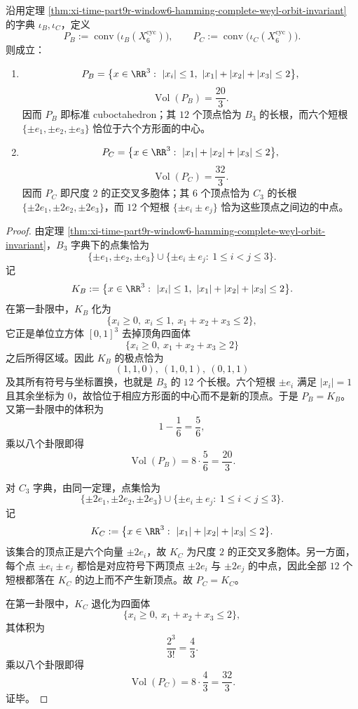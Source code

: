 \begin{theorem}\label{thm:xi-time-part9r-window6-b3c3-root-polytopes}
沿用定理 \ref{thm:xi-time-part9r-window6-hamming-complete-weyl-orbit-invariant} 的字典 \(\iota_B,\iota_C\)，定义
\[
P_B:=\operatorname{conv}\bigl(\iota_B(X_6^{\mathrm{cyc}})\bigr),
\qquad
P_C:=\operatorname{conv}\bigl(\iota_C(X_6^{\mathrm{cyc}})\bigr).
\]
则成立：
\begin{enumerate}
  \item
  \[
  P_B
  =
  \bigl\{x\in\RR^3:\ |x_i|\le 1,\ |x_1|+|x_2|+|x_3|\le 2\bigr\},
  \]
  \[
  \operatorname{Vol}(P_B)=\frac{20}{3}.
  \]
  因而 \(P_B\) 即标准 cuboctahedron；其 \(12\) 个顶点恰为 \(B_3\) 的长根，而六个短根 \(\{\pm e_1,\pm e_2,\pm e_3\}\) 恰位于六个方形面的中心。
  \item
  \[
  P_C
  =
  \bigl\{x\in\RR^3:\ |x_1|+|x_2|+|x_3|\le 2\bigr\},
  \]
  \[
  \operatorname{Vol}(P_C)=\frac{32}{3}.
  \]
  因而 \(P_C\) 即尺度 \(2\) 的正交叉多胞体；其 \(6\) 个顶点恰为 \(C_3\) 的长根 \(\{\pm 2e_1,\pm 2e_2,\pm 2e_3\}\)，而 \(12\) 个短根 \(\{\pm e_i\pm e_j\}\) 恰为这些顶点之间边的中点。
\end{enumerate}
\end{theorem}
\begin{proof}
由定理 \ref{thm:xi-time-part9r-window6-hamming-complete-weyl-orbit-invariant}，\(B_3\) 字典下的点集恰为
\[
\{\pm e_1,\pm e_2,\pm e_3\}\cup\{\pm e_i\pm e_j:\ 1\le i<j\le 3\}.
\]
记
\[
K_B:=\bigl\{x\in\RR^3:\ |x_i|\le 1,\ |x_1|+|x_2|+|x_3|\le 2\bigr\}.
\]
在第一卦限中，\(K_B\) 化为
\[
\bigl\{x_i\ge 0,\ x_i\le 1,\ x_1+x_2+x_3\le 2\bigr\},
\]
它正是单位立方体 \([0,1]^3\) 去掉顶角四面体
\[
\bigl\{x_i\ge 0,\ x_1+x_2+x_3\ge 2\bigr\}
\]
之后所得区域。因此 \(K_B\) 的极点恰为
\[
(1,1,0),\ (1,0,1),\ (0,1,1)
\]
及其所有符号与坐标置换，也就是 \(B_3\) 的 \(12\) 个长根。六个短根 \(\pm e_i\) 满足 \(|x_i|=1\) 且其余坐标为 \(0\)，故恰位于相应方形面的中心而不是新的顶点。于是 \(P_B=K_B\)。又第一卦限中的体积为
\[
1-\frac16=\frac56,
\]
乘以八个卦限即得
\[
\operatorname{Vol}(P_B)=8\cdot \frac56=\frac{20}{3}.
\]

对 \(C_3\) 字典，由同一定理，点集恰为
\[
\{\pm 2e_1,\pm 2e_2,\pm 2e_3\}\cup\{\pm e_i\pm e_j:\ 1\le i<j\le 3\}.
\]
记
\[
K_C:=\bigl\{x\in\RR^3:\ |x_1|+|x_2|+|x_3|\le 2\bigr\}.
\]
该集合的顶点正是六个向量 \(\pm 2e_i\)，故 \(K_C\) 为尺度 \(2\) 的正交叉多胞体。另一方面，每个点 \(\pm e_i\pm e_j\) 都恰是对应符号下两顶点 \(\pm 2e_i\) 与 \(\pm 2e_j\) 的中点，因此全部 \(12\) 个短根都落在 \(K_C\) 的边上而不产生新顶点。故 \(P_C=K_C\)。

在第一卦限中，\(K_C\) 退化为四面体
\[
\bigl\{x_i\ge 0,\ x_1+x_2+x_3\le 2\bigr\},
\]
其体积为
\[
\frac{2^3}{3!}=\frac43.
\]
乘以八个卦限即得
\[
\operatorname{Vol}(P_C)=8\cdot \frac43=\frac{32}{3}.
\]
证毕。
\end{proof}

